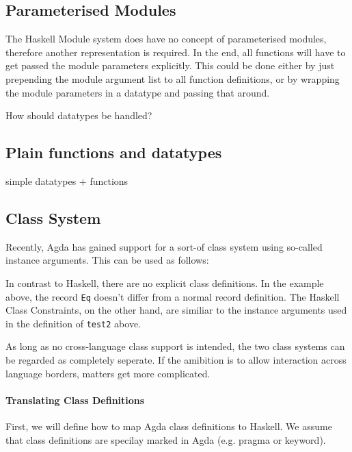 \documentclass[12pt, a4paper, twoside]{report}
\begin{document}
\subsection{Parameterised Modules}
The Haskell Module system does have no concept of parameterised modules, therefore another representation is required. In the end,
all functions will have to get passed the module parameters explicitly. This could be done either by just prepending the module
argument list to all function definitions, or by wrapping the module parameters in a datatype and passing that around.

How should datatypes be handled?

\subsection{Plain functions and datatypes}
simple datatypes + functions

\subsection{Class System}
Recently, Agda has gained support for a sort-of class system using so-called instance arguments. This can
be used as follows:


In contrast to Haskell, there are no explicit class definitions. In the example above,
the record \texttt{Eq} doesn't differ from a normal record definition.
The Haskell Class Constraints, on the other hand, are similiar to the instance
arguments used in the definition of \texttt{test2} above.

As long as no cross-language class support is intended, the two class systems can be
regarded as completely seperate. If the amibition is to allow interaction across
language borders, matters get more complicated.

\paragraph{Translating Class Definitions}
First, we will define how to map Agda class definitions to Haskell. We assume
that class definitions are specilay marked in Agda (e.g. pragma or keyword).
\end{document}
